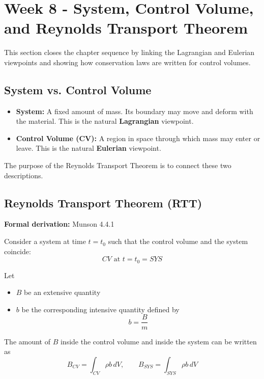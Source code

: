 \section{Week 8 - System, Control Volume, and Reynolds Transport Theorem}

This section closes the chapter sequence by linking the Lagrangian and Eulerian viewpoints and showing how conservation laws are written for control volumes.

\subsection{System vs. Control Volume}

\begin{itemize}
    \item \textbf{System:} A fixed amount of mass. Its boundary may move and deform with the material. This is the natural \textbf{Lagrangian} viewpoint.
    \item \textbf{Control Volume (CV):} A region in space through which mass may enter or leave. This is the natural \textbf{Eulerian} viewpoint.
\end{itemize}

The purpose of the Reynolds Transport Theorem is to connect these two descriptions.

\subsection{Reynolds Transport Theorem (RTT)}

\textbf{Formal derivation:} Munson 4.4.1

Consider a system at time $t=t_0$ such that the control volume and the system coincide:
\begin{equation}
    CV \text{ at } t=t_0 = SYS
\end{equation}

Let
\begin{itemize}
    \item $B$ be an extensive quantity
    \item $b$ be the corresponding intensive quantity defined by
    \begin{equation}
        b=\frac{B}{m}
    \end{equation}
\end{itemize}

The amount of $B$ inside the control volume and inside the system can be written as
\begin{equation}
    B_{CV}=\int_{CV}\rho b\,dV,
    \qquad
    B_{SYS}=\int_{SYS}\rho b\,dV
\end{equation}

